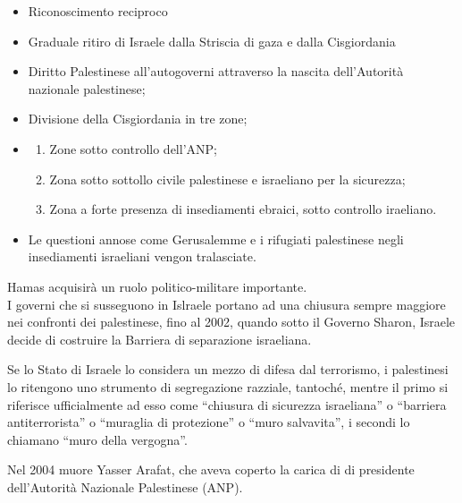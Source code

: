 \documentclass[a4paper]{article}
\newcommand{\quotes}[1]{``#1''}
\begin{document}
\begin{itemize}
    \item Riconoscimento reciproco
    \item Graduale ritiro di Israele dalla Striscia di gaza e dalla Cisgiordania
    \item Diritto Palestinese all'autogoverni attraverso la nascita dell'Autorità nazionale palestinese;
    \item Divisione della Cisgiordania in tre zone;
    \item \begin{enumerate}
        \item Zone sotto controllo dell'ANP;
        \item Zona sotto sottollo civile palestinese e israeliano per la sicurezza;
        \item Zona a forte presenza di insediamenti ebraici, sotto controllo iraeliano.
    \end{enumerate}
    \item Le questioni annose come Gerusalemme e i rifugiati palestinese negli insediamenti israeliani vengon tralasciate.
\end{itemize}

Hamas acquisirà un ruolo politico-militare importante.
\\
I governi che si susseguono in Islraele portano ad una chiusura sempre maggiore
nei confronti dei palestinese, fino al 2002, quando sotto il Governo
Sharon, Israele decide di costruire la Barriera di separazione israeliana.


Se lo Stato di Israele lo considera un mezzo di difesa dal terrorismo,
i palestinesi lo ritengono uno strumento di segregazione razziale,
tantoché, mentre il primo si riferisce ufficialmente ad esso come
\quotes{chiusura di sicurezza israeliana} o \quotes{barriera antiterrorista} o
\quotes{muraglia di protezione} o \quotes{muro salvavita},
i secondi lo chiamano \quotes{muro della vergogna}.

Nel 2004 muore Yasser Arafat, che aveva coperto la carica di
di presidente dell'Autorità Nazionale Palestinese (ANP).
\end{document}
